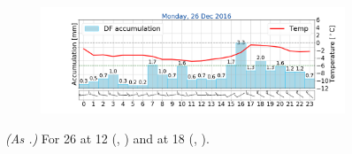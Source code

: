 \begin{figure}[ht!]
\begin{subfigure}[b]{0.49\textwidth}
		\includegraphics[trim={4.9cm 1.cm 1.5cm 1cm},clip,
		width=\textwidth]{./fig_weathermast/T_P_U_20161226}
		\caption{} \label{fig:TPU26}
	\end{subfigure}
	\caption{\textit{(As .)} For \SI{26}{\dec} at \SI{12}{\UTC} (\protect{}, \protect{}) and at \SI{18}{\UTC} (\protect{}, \protect{}).}\label{fig:weather:26}
\end{figure}




